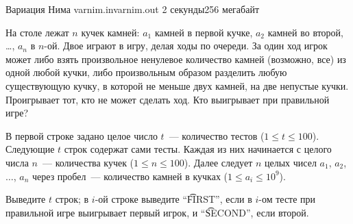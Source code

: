 
\begin{problem}{Вариация Нима}
{varnim.in}{varnim.out}
{2 секунды}{256 мегабайт}

На столе лежат $n$ кучек камней: $a_1$ камней в первой кучке,
$a_2$ камней во второй, \ldots, $a_n$ в $n$-ой. Двое играют
в игру, делая ходы по очереди. За один ход игрок может либо
взять произвольное ненулевое количество камней (возможно, все) из одной
любой кучки, либо произвольным образом разделить любую существующую кучку,
в которой не меньше двух камней, на две непустые кучки. Проигрывает
тот, кто не может сделать ход. Кто выигрывает при правильной игре?

\InputFile

В первой строке задано целое число $t$~--- количество
тестов ($1 \le t \le 100$).
Следующие $t$ строк содержат сами тесты. Каждая из них начинается
с целого числа $n$~--- количества кучек ($1 \le n \le 100$).
Далее следует $n$ целых чисел $a_1$, $a_2$, $\ldots$, $a_n$
через пробел~--- количество камней в кучках ($1 \le a_i \le 10^9$).

\OutputFile

Выведите $t$ строк; в $i$-ой строке выведите ``\t{FIRST}'',
если в $i$-ом тесте при правильной игре выигрывает первый игрок,
и ``\t{SECOND}'', если второй.

\Example

\begin{example}
%
\end{example}

\end{problem}
